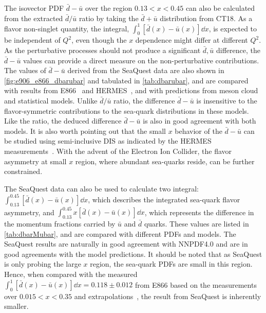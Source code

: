 \documentclass[reprint,aps,unsortedaddress,superscriptaddress,prl,floatfix,showpacs,linenumbers,final]{revtex4-2}
\def\,{}%
\begin{document}
The isovector PDF $\bar{d}-\bar{u}$ over the region $0.13<x<0.45$
can also be calculated from the extracted $\bar{d}/\bar{u}$ ratio by taking the $\bar{d}+\bar{u}$
distribution from CT18.
As a flavor non-singlet quantity, the integral, $\int^1_0 \left[\bar{d}\left(x\right) - \bar{u}\left(x\right)\right] \dd{x}$,
is expected to be independent of $Q^2$, even though the $x$ dependence might differ at different $Q^2$.
As the perturbative processes should not produce a significant $\bar{d},\,\bar{u}$ difference,
the $\bar{d}-\bar{u}$ values can provide a direct measure on the non-perturbative contributions.
The values of $\bar{d}-\bar{u}$ derived from the SeaQuest data are also shown in \cref{fig:e906_e866_dbarubar} and tabulated in \cref{tab:dbarubar},
and are compared with results from E866~\cite{towell2001} and HERMES~\cite{ackerstaff1998},
and with predictions from meson cloud and statistical models.
Unlike $\bar{d}/\bar{u}$ ratio, the difference $\bar{d}-\bar{u}$ is insensitive to the flavor-symmetric contributions
to the sea-quark distributions in these models. Like the ratio, the deduced difference $\bar{d}-\bar{u}$ is also
in good agreement with both models.
It is also worth pointing out that the small $x$ behavior of the $\bar{d}-\bar{u}$ can be studied using
semi-inclusive DIS as indicated by the HERMES measurements~\cite{ackerstaff1998}.
With the advent of the Electron Ion Collider, the flavor asymmetry at small $x$ region, where abundant sea-quarks reside,
can be further constrained.

The SeaQuest data can also be used to calculate two integral: $\int^{0.45}_{0.13} \left[\bar{d}\left(x\right) - \bar{u}\left(x\right) \right]\dd{x}$,
which describes the integrated sea-quark flavor asymmetry, and $\int^{0.45}_{0.13} x\left[\bar{d}\left(x\right) - \bar{u}\left(x\right) \right]\dd{x}$,
which represents the difference in the momentum fractions carried by $\bar{u}$ and $\bar{d}$ quarks.
These values are listed in \cref{tab:dbarMubar}, and are compared with different PDFs and models.
The SeaQuest results are naturally in good agreement with NNPDF4.0 and are in good agreements with the model predictions.
It should be noted that as SeaQuest is only probing the large $x$ region, the sea-quark PDFs are small in this region.
Hence, when compared with the measured $\int^{1}_{0} \left[\bar{d}\left(x\right) - \bar{u}\left(x\right) \right]\dd{x}=0.118\pm 0.012$
from E866 based on the measurements over $0.015<x<0.35$ and extrapolations~\cite{towell2001},
the result from SeaQuest is inherently smaller.
\end{document}
